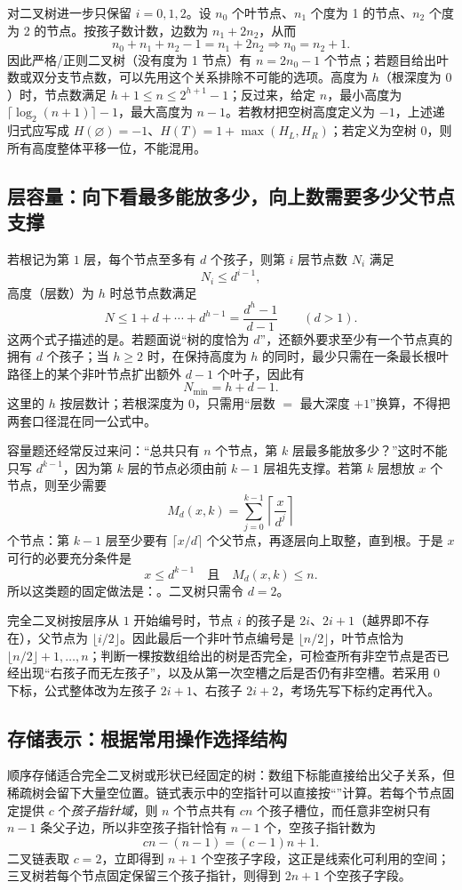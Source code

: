 \documentclass[UTF8,fontset=none,11pt,a4paper]{ctexart}
\begin{document}
对二叉树进一步只保留 $i=0,1,2$。设 $n_0$ 个叶节点、$n_1$ 个度为 1 的节点、$n_2$ 个度为 2 的节点。按孩子数计数，边数为 $n_1+2n_2$，从而
\[
n_0+n_1+n_2-1=n_1+2n_2\Longrightarrow n_0=n_2+1.
\]
因此严格/正则二叉树（没有度为 1 节点）有 $n=2n_0-1$ 个节点；若题目给出叶数或双分支节点数，可以先用这个关系排除不可能的选项。高度为 $h$（根深度为 $0$）时，节点数满足 $h+1\le n\le 2^{h+1}-1$；反过来，给定 $n$，最小高度为 $\lceil\log_2(n+1)\rceil-1$，最大高度为 $n-1$。若教材把空树高度定义为 $-1$，上述递归式应写成 $H(\varnothing)=-1$、$H(T)=1+\max(H_L,H_R)$；若定义为空树 $0$，则所有高度整体平移一位，不能混用。

\subsection{层容量：向下看最多能放多少，向上数需要多少父节点支撑}
若根记为第 $1$ 层，每个节点至多有 $d$ 个孩子，则第 $i$ 层节点数 $N_i$ 满足
\[
N_i\le d^{i-1},
\]
高度（层数）为 $h$ 时总节点数满足
\[
N\le 1+d+\cdots+d^{h-1}=\frac{d^h-1}{d-1}\qquad(d>1).
\]
这两个式子描述的是。若题面说“树的度恰为 $d$”，还额外要求至少有一个节点真的拥有 $d$ 个孩子；当 $h\ge2$ 时，在保持高度为 $h$ 的同时，最少只需在一条最长根叶路径上的某个非叶节点扩出额外 $d-1$ 个叶子，因此有
\[
N_{\min}=h+d-1.
\]
这里的 $h$ 按层数计；若根深度为 $0$，只需用“层数 $=$ 最大深度 $+1$”换算，不得把两套口径混在同一公式中。

容量题还经常反过来问：“总共只有 $n$ 个节点，第 $k$ 层最多能放多少？”这时不能只写 $d^{k-1}$，因为第 $k$ 层的节点必须由前 $k-1$ 层祖先支撑。若第 $k$ 层想放 $x$ 个节点，则至少需要
\[
M_d(x,k)=\sum_{j=0}^{k-1}\left\lceil\frac{x}{d^j}\right\rceil
\]
个节点：第 $k-1$ 层至少要有 $\lceil x/d\rceil$ 个父节点，再逐层向上取整，直到根。于是 $x$ 可行的必要充分条件是
\[
x\le d^{k-1}\quad\text{且}\quad M_d(x,k)\le n.
\]
所以这类题的固定做法是：。二叉树只需令 $d=2$。

完全二叉树按层序从 $1$ 开始编号时，节点 $i$ 的孩子是 $2i$、$2i+1$（越界即不存在），父节点为 $\lfloor i/2\rfloor$。因此最后一个非叶节点编号是 $\lfloor n/2\rfloor$，叶节点恰为 $\lfloor n/2\rfloor+1,\ldots,n$；判断一棵按数组给出的树是否完全，可检查所有非空节点是否已经出现“右孩子而无左孩子”，以及从第一次空槽之后是否仍有非空槽。若采用 $0$ 下标，公式整体改为左孩子 $2i+1$、右孩子 $2i+2$，考场先写下标约定再代入。

\subsection{存储表示：根据常用操作选择结构}
顺序存储适合完全二叉树或形状已经固定的树：数组下标能直接给出父子关系，但稀疏树会留下大量空位置。链式表示中的空指针可以直接按“”计算。若每个节点固定提供 $c$ 个\emph{孩子指针域}，则 $n$ 个节点共有 $cn$ 个孩子槽位，而任意非空树只有 $n-1$ 条父子边，所以非空孩子指针恰有 $n-1$ 个，空孩子指针数为
\[
cn-(n-1)=(c-1)n+1.
\]
二叉链表取 $c=2$，立即得到 $n+1$ 个空孩子字段，这正是线索化可利用的空间；三叉树若每个节点固定保留三个孩子指针，则得到 $2n+1$ 个空孩子字段。
\end{document}

